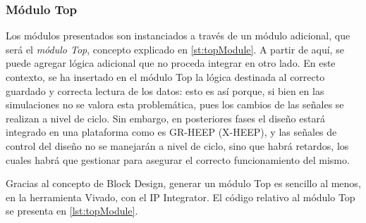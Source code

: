 \subsubsection{Módulo Top}
Los módulos presentados son instanciados a través de un módulo adicional, que será el \emph{módulo Top}, concepto explicado en \ref{st:topModule}. A partir de aquí, se puede agregar lógica adicional que no proceda integrar en otro lado. En este contexto, se ha insertado en el módulo Top la lógica destinada al correcto guardado y correcta lectura de los datos: esto es así porque, si bien en las simulaciones no se valora esta problemática, pues los cambios de las señales se realizan a nivel de ciclo. Sin embargo, en posteriores fases el diseño estará integrado en una plataforma como es GR-HEEP (X-HEEP), y las señales de control del diseño no se manejarán a nivel de ciclo, sino que habrá retardos, los cuales habrá que gestionar  para asegurar el correcto funcionamiento del mismo. 

Gracias al concepto de Block Design, generar un módulo Top es sencillo al menos, en la herramienta Vivado, con el IP Integrator. El código relativo al módulo Top se presenta en \ref{lst:topModule}.

